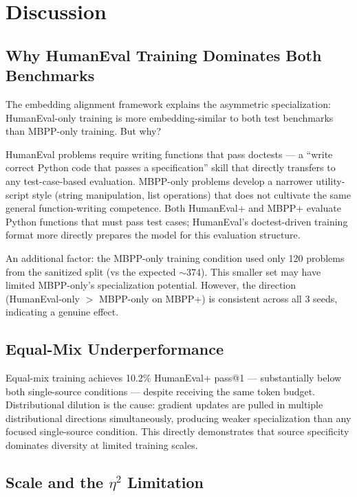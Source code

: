 \section{Discussion}
\label{sec:discussion}

\subsection{Why HumanEval Training Dominates Both Benchmarks}

The embedding alignment framework explains the asymmetric specialization: HumanEval-only
training is more embedding-similar to both test benchmarks than MBPP-only training. But why?

HumanEval problems require writing functions that pass doctests --- a ``write correct Python code
that passes a specification'' skill that directly transfers to any test-case-based evaluation.
MBPP-only problems develop a narrower utility-script style (string manipulation, list operations)
that does not cultivate the same general function-writing competence. Both HumanEval+ and MBPP+
evaluate Python functions that must pass test cases; HumanEval's doctest-driven training format
more directly prepares the model for this evaluation structure.

An additional factor: the MBPP-only training condition used only 120 problems from the
sanitized split (vs the expected $\sim$374). This smaller set may have limited MBPP-only's
specialization potential. However, the direction (HumanEval-only $>$ MBPP-only on MBPP+) is
consistent across all 3 seeds, indicating a genuine effect.

\subsection{Equal-Mix Underperformance}

Equal-mix training achieves 10.2\% HumanEval+ pass@1 --- substantially below both single-source
conditions --- despite receiving the same token budget. Distributional dilution is the cause:
gradient updates are pulled in multiple distributional directions simultaneously, producing
weaker specialization than any focused single-source condition. This directly demonstrates that
source specificity dominates diversity at limited training scales.

\subsection{Scale and the $\eta^2$ Limitation}

